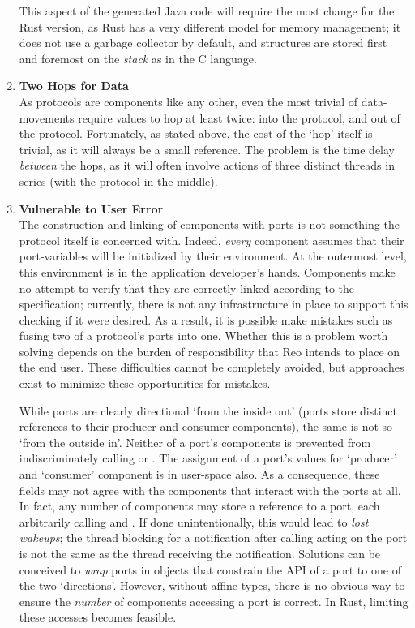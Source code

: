 \begin{enumerate}
	This aspect of the generated Java code will require the most change for the Rust version, as Rust has a very different model for memory management; it does not use a garbage collector by default, and structures are stored first and foremost on the \textit{stack} as in the C language.
	
	\item \textbf{Two Hops for Data}\\
	As protocols are components like any other, even the most trivial of data-movements require values to hop at least twice: into the protocol, and out of the protocol. Fortunately, as stated above, the cost of the `hop' itself is trivial, as it will always be a small reference. The problem is the time delay \textit{between} the hops, as it will often involve actions of three distinct threads in series (with the protocol in the middle). 
	
	\item \textbf{Vulnerable to User Error}\\
	The construction and linking of components with ports is not something the protocol itself is concerned with. Indeed, \textit{every} component assumes that their port-variables will be initialized by their environment. At the outermost level, this environment is in the application developer's hands. Components make no attempt to verify that they are correctly linked according to the specification; currently, there is not any infrastructure in place to support this checking if it were desired. As a result, it is possible make mistakes such as fusing two of a protocol's ports into one. Whether this is a problem worth solving depends on the burden of responsibility that Reo intends to place on the end user. These difficulties cannot be completely avoided, but approaches exist to minimize these opportunities for mistakes.
	
	While ports are clearly directional `from the inside out' (ports store distinct references to their producer and consumer components), the same is not so `from the outside in'. Neither of a port's components is prevented from indiscriminately calling  or . The assignment of a port's values for `producer' and `consumer' component is in user-space also. As a consequence, these fields may not agree with the components that interact with the ports at all. In fact, any number of components may store a reference to a port, each arbitrarily calling  and . If done unintentionally, this would lead to \textit{lost wakeups}; the thread blocking for a notification after calling acting on the port is not the same as the thread receiving the notification. Solutions can be conceived to \textit{wrap} ports in objects that constrain the API of a port to one of the two `directions'. However, without affine types, there is no obvious way to ensure the \textit{number} of components accessing a port is correct. In Rust, limiting these accesses becomes feasible.
	

\end{enumerate}
